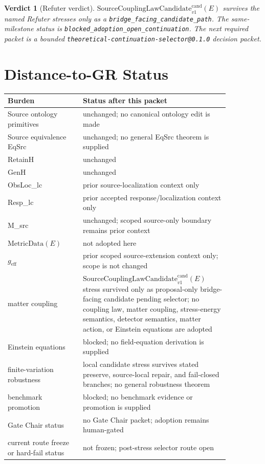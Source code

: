 \documentclass[11pt]{article}
\newcommand{\MetricData}{\mathrm{MetricData}}
\newcommand{\geff}{g_{\mathrm{eff}}}
\newcommand{\SourceCoupCand}{\mathrm{SourceCouplingLawCandidate}^{\mathrm{cand}}_{v1}}
\newtheorem{verdict}{Verdict}
\begin{document}
\begin{verdict}[Refuter verdict]
\(\SourceCoupCand(E)\) survives the named Refuter stresses only as a
\texttt{bridge\_facing\_candidate\_path}. The same-milestone status is
\texttt{blocked\_adoption\_open\_continuation}. The next required packet is a
bounded \texttt{theoretical-continuation-selector@0.1.0} decision packet.
\end{verdict}

\section{Distance-to-GR Status}

\begin{longtable}{p{0.30\linewidth}p{0.56\linewidth}}
\toprule
Burden & Status after this packet \\
\midrule
Source ontology primitives & unchanged; no canonical ontology edit is made \\
Source equivalence EqSrc & unchanged; no general EqSrc theorem is supplied \\
RetainH & unchanged \\
GenH & unchanged \\
ObsLoc\_lc & prior source-localization context only \\
Resp\_lc & prior accepted response/localization context only \\
M\_src & unchanged; scoped source-only boundary remains prior context \\
\(\MetricData(E)\) & not adopted here \\
\(\geff\) & prior scoped source-extension context only; scope is not changed \\
matter coupling & \(\SourceCoupCand(E)\) stress survived only as proposal-only bridge-facing candidate pending selector; no coupling law, matter coupling, stress-energy semantics, detector semantics, matter action, or Einstein equations are adopted \\
Einstein equations & blocked; no field-equation derivation is supplied \\
finite-variation robustness & local candidate stress survives stated preserve, source-local repair, and fail-closed branches; no general robustness theorem \\
benchmark promotion & blocked; no benchmark evidence or promotion is supplied \\
Gate Chair status & no Gate Chair packet; adoption remains human-gated \\
current route freeze or hard-fail status & not frozen; post-stress selector route open \\
\bottomrule
\end{longtable}
\end{document}
